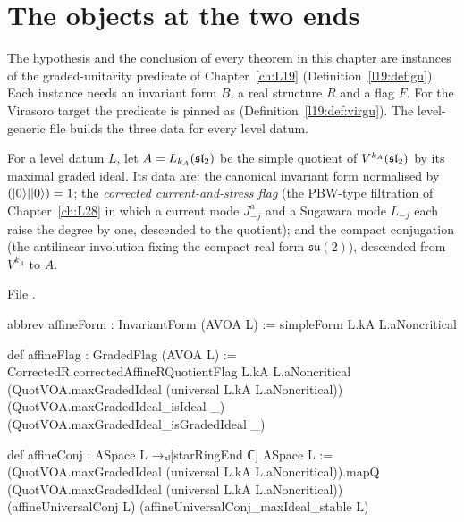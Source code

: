\section{The objects at the two ends}\label{l29:sec:endpoints}

The hypothesis and the conclusion of every theorem in this chapter are instances of the graded-unitarity predicate
 of Chapter~\ref{ch:L19} (Definition~\ref{l19:def:gu}). Each instance needs an invariant
form $B$, a real structure $R$ and a flag $F$. For the Virasoro target the predicate is pinned as
 (Definition~\ref{l19:def:virgu}). The level-generic file builds the three data for every
level datum.

\begin{definition}\label{l29:def:endpoint}
For a level datum $L$, let $A=L_{k_A}(\mathfrak{sl}_2)$ be the simple quotient of $V^{k_A}(\mathfrak{sl}_2)$ by its
maximal graded ideal. Its data are: the canonical invariant form normalised by $(|0\rangle||0\rangle)=1$;
the \emph{corrected current-and-stress flag} (the PBW-type filtration of Chapter~\ref{ch:L28} in which a current mode
$J^a_{-j}$ and a Sugawara mode $L_{-j}$ each raise the degree by one, descended to the quotient); and the compact
conjugation (the antilinear involution fixing the compact real form $\mathfrak{su}(2)$), descended from
$V^{k_A}$ to $A$.
\end{definition}

\noindent File .
\begin{leancode}
abbrev affineForm : InvariantForm (AVOA L) := simpleForm L.kA L.aNoncritical

def affineFlag : GradedFlag (AVOA L) :=
  CorrectedR.correctedAffineRQuotientFlag L.kA L.aNoncritical
    (QuotVOA.maxGradedIdeal (universal L.kA L.aNoncritical))
    (QuotVOA.maxGradedIdeal_isIdeal _)
    (QuotVOA.maxGradedIdeal_isGradedIdeal _)

def affineConj : ASpace L →ₛₗ[starRingEnd ℂ] ASpace L :=
  (QuotVOA.maxGradedIdeal (universal L.kA L.aNoncritical)).mapQ
    (QuotVOA.maxGradedIdeal (universal L.kA L.aNoncritical))
    (affineUniversalConj L) (affineUniversalConj_maxIdeal_stable L)
\end{leancode}

